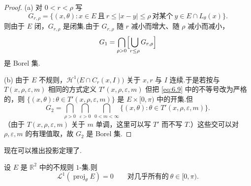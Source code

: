 \begin{proof}
(a) 对 $0<r<\rho$ 写
\[
  G_{r,\rho}=\{(x,\theta):x\in E\ \text{且}\ r\leq|x-y|\leq\rho\ \text{对某个}\ y\in E\cap L_\theta(x)\}.
\]
则由于 $E$ 闭，$G_{r,\rho}$ 是闭集.由于 $G_{r,\rho}$ 随 $r$ 减小而增大、随 $\rho$ 减小而减小，
\[
  G_1=\bigcap_{\rho>0}\Bigl[\bigcup_{r\leq\rho}G_{r,\rho}\Bigr]
\]
是 Borel 集.

(b) 由于 $E$ 不规则，$\mathcal{H}^1\bigl(E\cap C_r(x,I)\bigr)$ 关于 $x,r$ 与 $I$ 连续.于是若按与 $T(x,\rho,\varepsilon,m)$ 相同的方式定义 $T'(x,\rho,\varepsilon,m)$ 但把 \eqref{eq:6.9} 中的不等号改为严格的，则 $\{(x,\theta):\theta\in T'(x,\rho,\varepsilon,m)\}$ 是 $E\times[0,\pi)$ 中的开集.但
\[
  G_2=\bigcap_{\rho>0}\ \bigcap_{\varepsilon>0}\ \bigcap_{0<m<\infty}\{(x,\theta):\theta\in T'(x,\rho,\varepsilon,m)\}.
\]
（由于 $T(x,\rho,\varepsilon,m)$ 关于 $m$ 单调，这里可以写 $T'$ 而不写 $T$.）这些交可以对 $\rho,\varepsilon,m$ 的有理值取，故 $G_2$ 是 Borel 集.
\end{proof}

现在可以推出投影定理了.

\begin{theorem}\label{thm:6.13}
设 $E$ 是 $\mathbb{R}^2$ 中的不规则 $1$-集.则
\[
  \mathscr{L}^{1}(\operatorname{proj}_{\theta}E)=0\qquad\text{对几乎所有的}\ \theta\in[0,\pi).
\]
\end{theorem}

